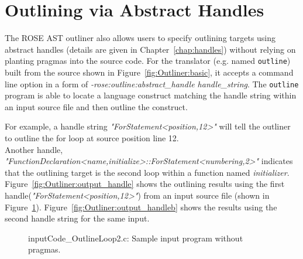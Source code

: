 \section{Outlining via Abstract Handles}
\label{sec:Outliner:handle}
The ROSE AST outliner also allows users to specify outlining targets using
abstract handles (details are given in Chapter~\ref{chap:handles}) without relying
on planting pragmas into the source code. 
For the translator (e.g. named \texttt{outline}) built from the source
shown in Figure~\ref{fig:Outliner:basic}, 
it accepts a command line option in a form of \textit{-rose:outline:abstract\_handle handle\_string}. 
The \texttt{outline} program is able to locate
a language construct matching the handle string within an input source file and then outline the construct. 

For example, a handle string \textit{"ForStatement<position,12>"} will tell the outliner to outline the for loop
at source position line 12. \\
Another handle,
\textit{"FunctionDeclaration<name,initialize>::ForStatement<numbering,2>"}
indicates that the outlining target is the second loop within a
function named \textit{initializer}. 
Figure~\ref{fig:Outliner:output_handle} shows the outlining results using the first handle(\textit{"ForStatement<position,12>"}) from an input source file  (shown in
Figure~\ref{fig:Outliner:input_handle}).
Figure~\ref{fig:Outliner:output_handleb} shows the results using the second
handle string for the same input.

\begin{figure}[!b]
{\indent
{\mySmallFontSize
\begin{latexonly}
   
\end{latexonly}
\begin{htmlonly}
   
\end{htmlonly}

}
}
\caption{inputCode\_OutlineLoop2.c: Sample input program without pragmas.}
\label{fig:Outliner:input_handle}
\end{figure}

